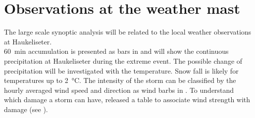 \section{Observations at the weather mast}
\label{sec:loc_obs}
The large scale synoptic analysis will be related to the local weather  observations at Haukeliseter. 
\\
\SI{60}{\minute} accumulation is presented as bars in  and will show the continuous precipitation at Haukeliseter during the extreme event. The possible change of precipitation will be investigated with the temperature. Snow fall is likely for temperatures up to \SI{2}{\celsius}. The intensity of the storm can be classified by the hourly averaged wind speed and direction as wind barbs in \SI{}{\mPs}.
To understand which damage a storm can have, \cite{faeraas_urd_2016} released a table to associate wind strength with damage (see ).



